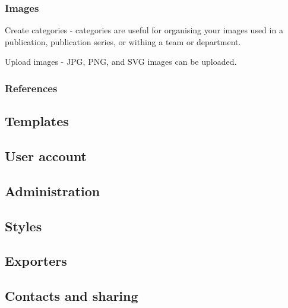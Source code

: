 \documentclass{article}
\begin{document}
\subsubsection{Images}\label{H9336653}



Create categories - categories are useful for organising your images used in a publication, publication series, or withing a team or department.


Upload images - JPG, PNG, and SVG images can be uploaded.


\subsubsection{References}\label{H6668129}






\subsection{Templates}\label{H7350400}






\subsection{User account}\label{H8460509}






\subsection{Administration}\label{H4807452}






\subsection{Styles}\label{H5511626}






\subsection{Exporters}\label{H6892689}






\subsection{Contacts and sharing}\label{H8001298}
\end{document}
